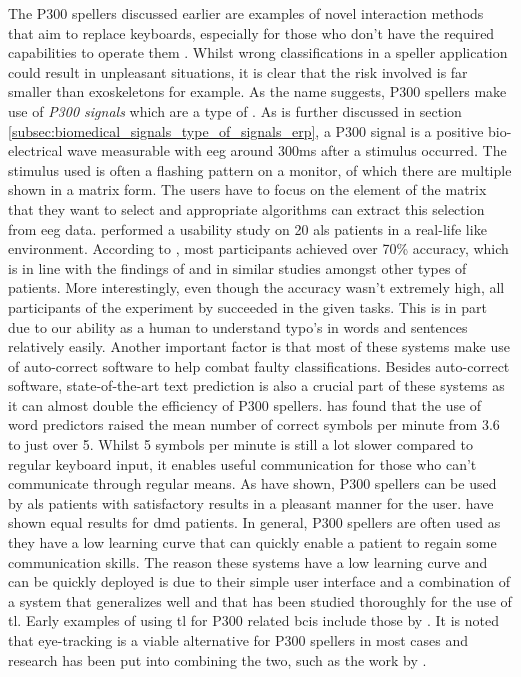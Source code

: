 The P300 spellers discussed earlier are examples of novel interaction methods that aim to replace keyboards, especially for those who don't have the required capabilities to operate them \citep{p300_spellers, p300_spellers_review}.
Whilst wrong classifications in a speller application could result in unpleasant situations, it is clear that the risk involved is far smaller than exoskeletons for example.
As the name suggests,  P300 spellers make use of \textit{P300 signals} which are a type of .
As is further discussed in section \ref{subsec:biomedical_signals_type_of_signals_erp}, a P300 signal is a positive bio-electrical wave measurable with \gls{eeg} around 300ms after a stimulus occurred.
The stimulus used is often a flashing pattern on a monitor, of which there are multiple shown in a matrix form.
The users have to focus on the element of the matrix that they want to select and appropriate algorithms can extract this selection from \gls{eeg} data.
 performed a usability study on 20 \gls{als} patients in a real-life like environment.
According to \citet{p300_speller_real_life}, most participants achieved over 70\% accuracy, which is in line with the findings of \citet{p300_spellers_review} and \citet{p300_speller_real_life2} in similar studies amongst other types of patients.
More interestingly, even though the accuracy wasn't extremely high, all participants of the experiment by \citet{p300_speller_real_life} succeeded in the given tasks.
This is in part due to our ability as a human to understand typo's in words and sentences relatively easily.
Another important factor is that most of these systems make use of auto-correct software to help combat faulty classifications.
Besides auto-correct software, state-of-the-art text prediction is also a crucial part of these systems as it can almost double the efficiency of P300 spellers.
\citet{p300_speller_real_life} has found that the use of word predictors raised the mean number of correct symbols per minute from 3.6 to just over 5.
Whilst 5 symbols per minute is still a lot slower compared to regular keyboard input, it enables useful communication for those who can't communicate through regular means.
As \citet{p300_speller_real_life2} have shown, P300 spellers can be used by \gls{als} patients with satisfactory results in a pleasant manner for the user.
 have shown equal results for \gls{dmd} patients.
In general, P300 spellers are often used as they have a low learning curve that can quickly enable a patient to regain some communication skills.
The reason these systems have a low learning curve and can be quickly deployed is due to their simple user interface and a combination of a system that generalizes well and that has been studied thoroughly for the use of \gls{tl}.
Early examples of using \gls{tl} for P300 related \glspl{bci} include those by \citet{p300_speller_tl}.
It is noted that eye-tracking is a viable alternative for P300 spellers in most cases and research has been put into combining the two, such as the work by \citet{p300_eye_tracking_speller}.

